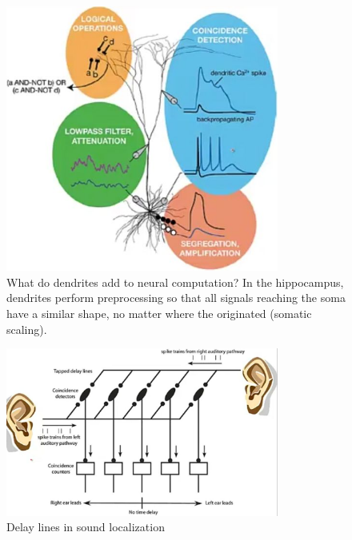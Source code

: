 \documentclass[]{article}
\begin{document}
\begin{figure}[H]
	\caption[What do dendrites add to neural computation?\cite{london2005dendritic}]{What do dendrites add to neural computation? In the hippocampus, dendrites perform preprocessing so that all signals reaching the soma have a similar shape, no matter where the originated (somatic scaling).}
	\includegraphics[width=0.8\textwidth]{what-do-dendrites-add}
\end{figure}


\begin{figure}[H]
	\caption[Delay lines in sound localization]{Delay lines in sound localization}
	\includegraphics[width=0.8\textwidth]{delay-sound}
\end{figure}
\end{document}
